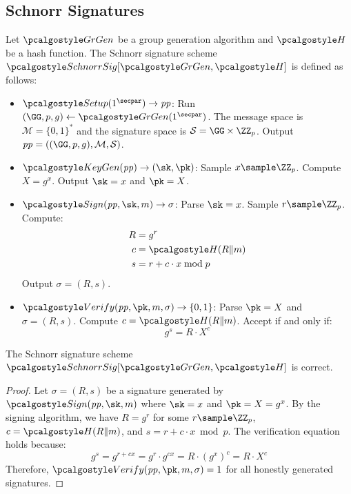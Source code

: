 \subsection{Schnorr Signatures}

\begin{definition}\label{def:schnorr}
  Let $\grgen$ be a group generation algorithm and $\algo{H}$ be a hash function. The Schnorr signature scheme $\algo{SchnorrSig}[\grgen, \algo{H}]$ is defined as follows:
  \begin{itemize}
    \item $\algo{Setup}(1^\secpar) \rightarrow \params$: Run $\gparam \gets \grgen(1^\secpar)$. The message space is $\mathcal{M} = \{0,1\}^*$ and the signature space is $\mathcal{S} = \GG \times \ZZ_p$. Output $\params = (\gparam, \mathcal{M}, \mathcal{S})$.
    
    \item $\algo{KeyGen}(\params) \rightarrow (\sk, \pk)$: Sample $x \sample \ZZ_p$. Compute $X = g^x$. Output $\sk = x$ and $\pk = X$.
    
    \item $\algo{Sign}(\params, \sk, m) \rightarrow \sigma$: Parse $\sk = x$. Sample $r \sample \ZZ_p$. Compute:
    \begin{align*}
      R &= g^r \\
      c &= \algo{H}(R \| m) \\
      s &= r + c \cdot x \bmod p
    \end{align*}
    Output $\sigma = (R, s)$.
    
    \item $\algo{Verify}(\params, \pk, m, \sigma) \rightarrow \{0, 1\}$: Parse $\pk = X$ and $\sigma = (R, s)$. Compute $c = \algo{H}(R \| m)$. Accept if and only if:
    \[
      g^s = R \cdot X^c
    \]
  \end{itemize}
\end{definition}

\begin{lemma}\label{lem:schnorr-correctness}
  The Schnorr signature scheme $\algo{SchnorrSig}[\grgen, \algo{H}]$ is correct.
\end{lemma}

\begin{proof}
  Let $\sigma = (R, s)$ be a signature generated by $\algo{Sign}(\params, \sk, m)$ where $\sk = x$ and $\pk = X = g^x$. By the signing algorithm, we have $R = g^r$ for some $r \sample \ZZ_p$, $c = \algo{H}(R \| m)$, and $s = r + c \cdot x \bmod p$. The verification equation holds because:
  \[
    g^s = g^{r + cx} = g^r \cdot g^{cx} = R \cdot (g^x)^c = R \cdot X^c
  \]
  Therefore, $\algo{Verify}(\params, \pk, m, \sigma) = 1$ for all honestly generated signatures.
\end{proof}


